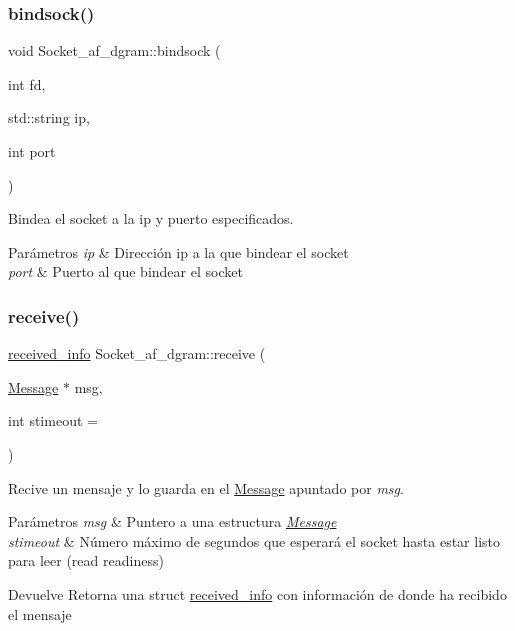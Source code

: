 \subsubsection{\texorpdfstring{bindsock()}{bindsock()}}
{\footnotesize\ttfamily void Socket\+\_\+af\+\_\+dgram\+::bindsock (\begin{DoxyParamCaption}\item[{int}]{fd,  }\item[{std\+::string}]{ip,  }\item[{int}]{port }\end{DoxyParamCaption})}



Bindea el socket a la ip y puerto especificados. 


\begin{DoxyParams}{Parámetros}
{\em ip} & Dirección ip a la que bindear el socket \\
\hline
{\em port} & Puerto al que bindear el socket \\
\hline
\end{DoxyParams}
\mbox{\label{classSocket__af__dgram_ac7d122d2317d980c48964076c3c7e2bb}} 
\subsubsection{\texorpdfstring{receive()}{receive()}}
{\footnotesize\ttfamily \hyperlink{structreceived__info}{received\+\_\+info} Socket\+\_\+af\+\_\+dgram\+::receive (\begin{DoxyParamCaption}\item[{\hyperlink{structMessage}{Message} $\ast$}]{msg,  }\item[{int}]{stimeout = {} }\end{DoxyParamCaption})}



Recive un mensaje y lo guarda en el \hyperlink{structMessage}{Message} apuntado por {\itshape msg}. 


\begin{DoxyParams}{Parámetros}
{\em msg} & Puntero a una estructura {\itshape \hyperlink{structMessage}{Message}} \\
\hline
{\em stimeout} & Número máximo de segundos que esperará el socket hasta estar listo para leer (read readiness) \\
\hline
\end{DoxyParams}
\begin{DoxyReturn}{Devuelve}
Retorna una struct \hyperlink{structreceived__info}{received\+\_\+info} con información de donde ha recibido el mensaje 
\end{DoxyReturn}
\mbox{\label{classSocket__af__dgram_a744bb661eeebe5b5cdfca0028da6bd88}} 
